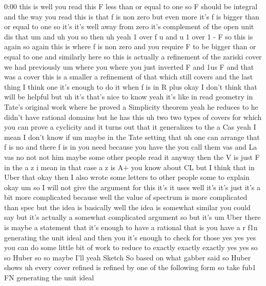 \begin{unfinished}{0:00}
this  is  well  you  read  this  F  less  than
or  equal  to  one  so  F  should  be  integral
and  the  way  you  read  this  is  that  f  is
non  zero  but  even  more  it's  f  is  bigger
than  or  equal  to  one  so  it's  it's  well
away  from  zero  it's  complement  of  the
open  unit  dis  that  um
and  uh  you
so  then  uh  yeah  1  over
f  u  and  u  1  over  1  -
F
so  this  is  again  so  again  this  is  where
f  is  non  zero  and  you  require  F  to  be
bigger  than  or  equal  to  one  and
similarly  here  so  this  is  actually  a
refinement  of  the  zariski  cover  we  had
previously  um  where  you  where  you  just
inverted  F  and  1us  F  and  that  was  a
cover  this  is  a  smaller  a  refinement  of
that  which  still  covers  and  the  last
thing  I  think  one  it's  enough  to  do  it
when  f  is  in  R  plus
okay  I  don't  think  that  will  be  helpful
but  uh  it's  that's  nice  to  know  yeah
it's  like  in  read  geometry  in  Tate's
original  work  where  he  proved  a
Simplicity  theorem  yeah  he  reduces  to  he
didn't  have  rational  domains  but  he  has
this  uh  two  two  types  of  covers  for
which  you  can  prove  a
cyclicity  and  it  turns  out  that  it
generalizes  to  the  a  Cas  yeah  I  mean  I
don't  know  if  um  maybe  in  the  Tate
setting  that  uh  one  can  arrange  that  f
is  no  and  there  f  is  in  you  need  because
you  have  the  you  call  them  vas  and  La
vas  no  not  not  him  maybe  some  other
people  read  it  anyway  then  the  V  is  just
F  in  the  a  z  i  mean  in  that  case  a  z  is
A+  you  know  about  CL  but  I  think  that  in
Uber  that  okay  then  I  also  wrote  some
letters  to  other  people  some  to  explain
okay  um  so  I  will  not  give  the  argument
for  this  it's  it  uses  well  it's  it's
just  it's  a  bit  more  complicated  because
well  the  value  of  spectrum  is  more
complicated  than  spec  but  the  idea  is
basically  well  the  idea  is  somewhat
similar  you  could  say  but  it's  actually
a  somewhat  complicated  argument  so  but
it's  um  Uber  there  is  maybe  a  statement
that  it's  enough  to  have  a  rational  that
is  you  have  a  r  f1n  generating  the  unit
ideal  and  then  you  it's  enough  to  check
for  those  yes  yes  yes  you  can  do  some
little  bit  of  work  to  reduce  to  exactly
exactly  exactly  yes  yes  so  so  Huber  so
so  maybe  I'll  yeah  Sketch  So  based  on
what  gabber  said  so  Huber
shows  uh  every
cover  refined  is  refined  by  one  of  the
following  form  so  take  fub1  FN
generating  the  unit  ideal

\end{unfinished}
